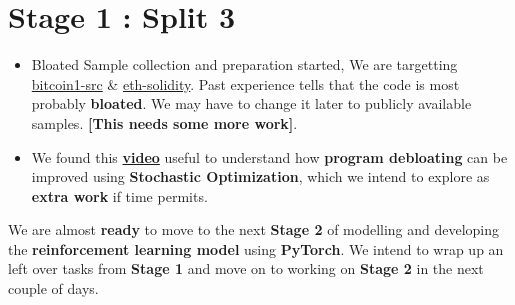 \documentclass{article} %
\begin{document}
\section*{Stage 1 : Split 3}
\begin{itemize}
	\item Bloated Sample collection and preparation started, We are targetting \href{https://github.com/bitcoin/bitcoin}{bitcoin1-src} \& \href{https://github.com/ethereum/solidity}{eth-solidity}. Past experience tells that the code is most probably \textbf{bloated}. We may have to change it later to publicly available samples. \textbf{\color{red}[This needs some more work]}.
	\item We found this \textbf{\href{https://www.youtube.com/watch?v=hC4zIwyv1bg}{video}} useful to understand how \textbf{program debloating} can be improved using \textbf{Stochastic Optimization}, which we intend to explore as \textbf{extra work} if time permits.
\end{itemize}

We are almost \textbf{\color{teal}ready} to move to the next \textbf{Stage 2} of modelling and developing the \textbf{\color{teal} reinforcement learning model} using \textbf{PyTorch}. We intend to wrap up an left over tasks from \textbf{Stage 1} and move on to working on \textbf{Stage 2} in the next couple of days.  
\end{document}
